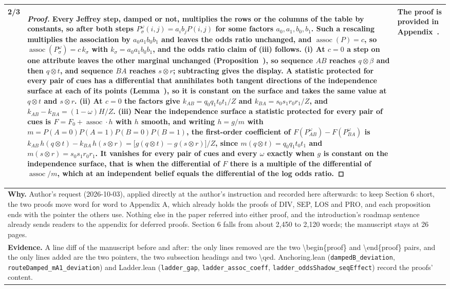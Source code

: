 \documentclass[10pt]{article}
\theoremstyle{definition}
\newcommand{\assoc}{\operatorname{assoc}}
\renewcommand{\ref}[1]{\textsc{\detokenize{#1}}}
\newlength{\fullw}\setlength{\fullw}{25.9cm}
\begin{document}
{\begin{longtable}{|p{0.9cm}|p{12.2cm}|p{12.2cm}|}
2/3 & \begin{proof} Every Jeffrey step, damped or not, multiplies the rows or the columns of the table by constants, so after both steps $P^{\omega}_{\sigma}(i,j)=a_i b_j P(i,j)$ for some factors $a_0,a_1,b_0,b_1$. Such a rescaling multiplies the association by $a_0a_1b_0b_1$ and leaves the odds ratio unchanged, and $\assoc(P)=c$, so $\assoc(P^{\omega}_{\sigma})=c\,k_\sigma$ with $k_\sigma=a_0a_1b_0b_1$, and the odds ratio claim of (iii) follows. (i) At $c=0$ a step on one attribute leaves the other marginal unchanged (Proposition~\ref{prop:IMM}), so sequence $AB$ reaches $q\otimes\beta$ and then $q\otimes t$, and sequence $BA$ reaches $s\otimes r$; subtracting gives the display. A statistic protected for every pair of cues has a differential that annihilates both tangent directions of the independence surface at each of its points (Lemma~\ref{lem:ASC}), so it is constant on the surface and takes the same value at $q\otimes t$ and $s\otimes r$. (ii) At $c=0$ the factors give $k_{AB}=q_0q_1t_0t_1/Z$ and $k_{BA}=s_0s_1r_0r_1/Z$, and $k_{AB}-k_{BA}=(1-\omega)H/Z$. (iii) Near the independence surface a statistic protected for every pair of cues is $F=F_0+\assoc\cdot h$ with $h$ smooth, and writing $h=g/m$ with $m=P(A{=}0)P(A{=}1)P(B{=}0)P(B{=}1)$, the first-order coefficient of $F(P^{\omega}_{AB})-F(P^{\omega}_{BA})$ is $k_{AB}\,h(q\otimes t)-k_{BA}\,h(s\otimes r)=\bigl[g(q\otimes t)-g(s\otimes r)\bigr]/Z$, since $m(q\otimes t)=q_0q_1t_0t_1$ and $m(s\otimes r)=s_0s_1r_0r_1$. It vanishes for every pair of cues and every $\omega$ exactly when $g$ is constant on the independence surface, that is when the differential of $F$ there is a multiple of the differential of $\assoc/m$, which at an independent belief equals the differential of the log odds ratio. \end{proof} & The proof is provided in Appendix~\ref{app:proofs}. \\ \hline
\multicolumn{3}{|p{\fullw}|}{\textbf{Why.} Author's request (2026-10-03), applied directly at the author's instruction and recorded here afterwards: to keep Section 6 short, the two proofs move word for word to Appendix A, which already holds the proofs of DIV, SEP, LOS and PRO, and each proposition ends with the pointer the others use. Nothing else in the paper referred into either proof, and the introduction's roadmap sentence already sends readers to the appendix for deferred proofs. Section 6 falls from about 2,450 to 2,120 words; the manuscript stays at 26 pages.} \\
\multicolumn{3}{|p{\fullw}|}{\textbf{Evidence.} A line diff of the manuscript before and after: the only lines removed are the two \textbackslash{}begin\{proof\} and \textbackslash{}end\{proof\} pairs, and the only lines added are the two pointers, the two subsection headings and two \textbackslash{}qed. Anchoring.lean (\texttt{dampedB\_deviation}, \texttt{routeDamped\_mA1\_deviation}) and Ladder.lean (\texttt{ladder\_gap}, \texttt{ladder\_assoc\_coeff}, \texttt{ladder\_oddsShadow\_seqEffect}) record the proofs' content.} \\ \hline

\end{longtable}}
\end{document}
